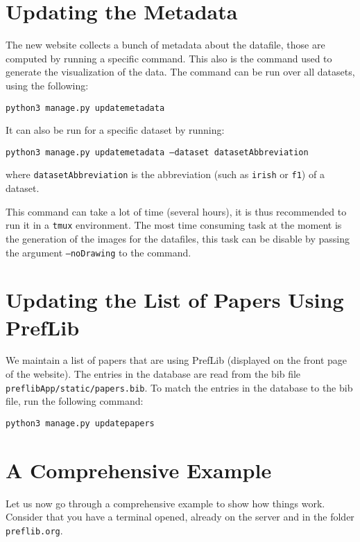 \documentclass{report}
\begin{document}
	\section{Updating the Metadata}
	
	The new website collects a bunch of metadata about the datafile, those are computed by running a specific command. This also is the command used to generate the visualization of the data. The command can be run over all datasets, using the following:
	
	\begin{center}
		\texttt{python3 manage.py updatemetadata}
	\end{center}

	\noindent It can also be run for a specific dataset by running:
	
	\begin{center}
		\texttt{python3 manage.py updatemetadata --dataset datasetAbbreviation}
	\end{center}

	\noindent where \texttt{datasetAbbreviation} is the abbreviation (such as \texttt{irish} or \texttt{f1}) of a dataset.
	
	This command can take a lot of time (several hours), it is thus recommended to run it in a \texttt{tmux} environment. The most time consuming task at the moment is the generation of the images for the datafiles, this task can be disable by passing the argument \texttt{--noDrawing} to the command.
	
	\section{Updating the List of Papers Using PrefLib}
	
	We maintain a list of papers that are using PrefLib (displayed on the front page of the website). The entries in the database are read from the bib file \texttt{preflibApp/static/papers.bib}. To match the entries in the database to the bib file, run the following command:
	
	\begin{center}
		\texttt{python3 manage.py updatepapers}
	\end{center}

	\section{A Comprehensive Example}
	
	Let us now go through a comprehensive example to show how things work. Consider that you have a terminal opened, already on the server and in the folder \texttt{preflib.org}.
	
\end{document}
